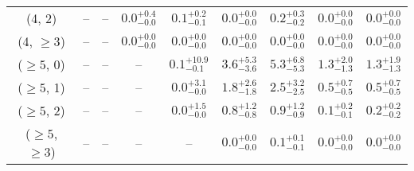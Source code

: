 \begin{table}[h!]
{\begin{tabular}{ccccccccc}
	(4, 2) & -- & -- & $0.0^{+ 0.4 }_{- 0.0 }$ & $0.1^{+ 0.2 }_{- 0.1 }$ & $0.0^{+ 0.0 }_{- 0.0 }$ & $0.2^{+ 0.3 }_{- 0.2 }$ & $0.0^{+ 0.0 }_{- 0.0 }$ & $0.0^{+ 0.0 }_{- 0.0 }$ \\[0.5ex] 
	(4, $\ge3$) & -- & -- & $0.0^{+ 0.0 }_{- 0.0 }$ & $0.0^{+ 0.0 }_{- 0.0 }$ & $0.0^{+ 0.0 }_{- 0.0 }$ & $0.0^{+ 0.0 }_{- 0.0 }$ & $0.0^{+ 0.0 }_{- 0.0 }$ & $0.0^{+ 0.0 }_{- 0.0 }$ \\[0.5ex] 
	($\ge5$, 0) & -- & -- & -- & $0.1^{+ 10.9 }_{- 0.1 }$ & $3.6^{+ 5.3 }_{- 3.6 }$ & $5.3^{+ 6.8 }_{- 5.3 }$ & $1.3^{+ 2.0 }_{- 1.3 }$ & $1.3^{+ 1.9 }_{- 1.3 }$ \\[0.5ex] 
	($\ge5$, 1) & -- & -- & -- & $0.0^{+ 3.1 }_{- 0.0 }$ & $1.8^{+ 2.6 }_{- 1.8 }$ & $2.5^{+ 3.2 }_{- 2.5 }$ & $0.5^{+ 0.7 }_{- 0.5 }$ & $0.5^{+ 0.7 }_{- 0.5 }$ \\[0.5ex] 
	($\ge5$, 2) & -- & -- & -- & $0.0^{+ 1.5 }_{- 0.0 }$ & $0.8^{+ 1.2 }_{- 0.8 }$ & $0.9^{+ 1.2 }_{- 0.9 }$ & $0.1^{+ 0.2 }_{- 0.1 }$ & $0.2^{+ 0.2 }_{- 0.2 }$ \\[0.5ex] 
	($\ge5$, $\ge3$) & -- & -- & -- & -- & $0.0^{+ 0.0 }_{- 0.0 }$ & $0.1^{+ 0.1 }_{- 0.1 }$ & $0.0^{+ 0.0 }_{- 0.0 }$ & $0.0^{+ 0.0 }_{- 0.0 }$ \\[0.5ex] 
	\hline
	\hline
\end{tabular}}
\end{table}
